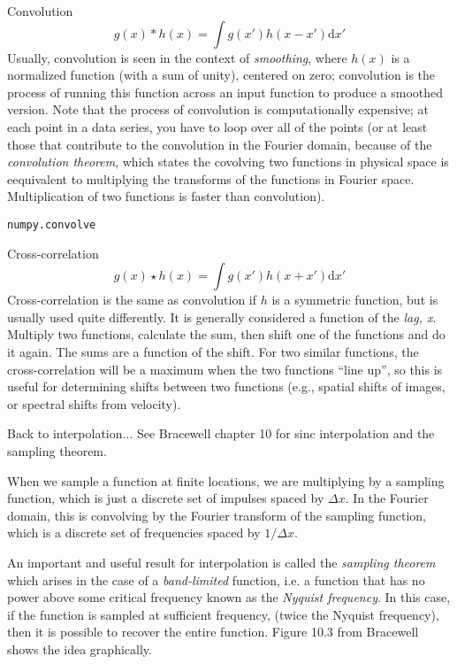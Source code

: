 \documentclass[12pt]{article}
\begin{document}
\begin{itemize*}
    \item Convolution
        $$ g(x) * h(x) = \int g(x')h(x-x') \mathrm{d}x' $$
        Usually, convolution is seen in the context of \emph{smoothing}, where $h(x)$ is
        a normalized function (with a sum of unity), centered on zero; convolution is
        the process of running this function across an input function to produce a
        smoothed version. Note that the process of convolution is computationally
        expensive; at each point in a data series, you have to loop over all of the
        points (or at least those that contribute to the convolution in the Fourier
        domain, because of the \emph{convolution theorem}, which states the covolving
        two functions in physical space is eequivalent to multiplying the transforms
        of the functions in Fourier space. Multiplication of two functions is faster
        than convolution).

        \texttt{numpy.convolve}

    \item Cross-correlation
        $$ g(x) \star h(x) = \int g(x')h(x+x') \mathrm{d}x' $$
        Cross-correlation is the same as convolution if $h$ is a symmetric function,
        but is usually used quite differently. It is generally considered a function of
        the \emph{lag, x}. Multiply two functions, calculate the sum, then shift one
        of the functions and do it again. The sums are a function of the shift. For
        two similar functions, the cross-correlation will be a maximum when the two
        functions ``line up'', so this is useful for determining shifts between two
        functions (e.g., spatial shifts of images, or spectral shifts from velocity).
\end{itemize*}

Back to interpolation$\ldots$ See Bracewell chapter 10 for sinc interpolation and
the sampling theorem.

When we sample a function at finite locations, we are multiplying by a
sampling function, which is just a discrete set of impulses spaced by
$\Delta x$. In the Fourier domain, this is convolving by the Fourier
transform of the sampling function, which is a discrete set of
frequencies spaced by $1/\Delta x$.

An important and useful result for interpolation is called the
\emph{sampling theorem} which arises in the case of a
\emph{band-limited} function,
i.e. a function that has no power above some critical frequency
known as the \emph{Nyquist frequency}.
In this case, if the function is sampled at sufficient frequency,
(twice the Nyquist frequency), then it is possible to
recover the entire function. Figure 10.3 from Bracewell shows the idea
graphically.
\end{document}
